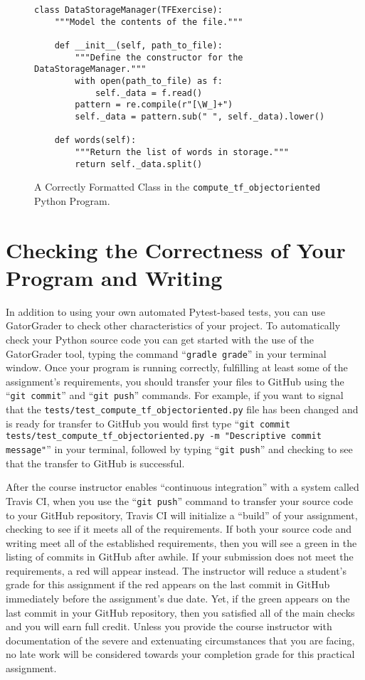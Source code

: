 \documentclass[11pt]{article}
\newcommand{\testprogramsource}{\lstinline{tests/test_compute_tf_objectoriented.py}}
\newcommand{\gatorgraderstart}{\command{gradle grade}}
\newcommand{\gitcommit}{\command{git commit}}
\newcommand{\gitpush}{\command{git push}}
\newcommand{\gitcommittestprogram}{\command{git commit tests/test_compute_tf_objectoriented.py -m "Descriptive commit message"}}
\newcommand{\command}[1]{``\lstinline{#1}''}
\newcommand{\step}[1]{``{#1}''}
\newcommand{\checkmark}{\ding{51}}
\newcommand{\naughtmark}{\ding{55}}
\begin{document}
\begin{figure}[t]
%
\begin{verbatim}
class DataStorageManager(TFExercise):
    """Model the contents of the file."""

    def __init__(self, path_to_file):
        """Define the constructor for the DataStorageManager."""
        with open(path_to_file) as f:
            self._data = f.read()
        pattern = re.compile(r"[\W_]+")
        self._data = pattern.sub(" ", self._data).lower()

    def words(self):
        """Return the list of words in storage."""
        return self._data.split()
\end{verbatim}
%
\vspace*{-.15in}
%
\caption{A Correctly Formatted Class in the {\tt compute\_tf\_objectoriented} Python Program.}\label{fig:data}
%
\vspace*{-.1in}
%
\end{figure}

\section*{Checking the Correctness of Your Program and Writing}

In addition to using your own automated Pytest-based tests, you can use
GatorGrader to check other characteristics of your project. To automatically
check your Python source code you can get started with the use of the
GatorGrader tool, typing the command \gatorgraderstart{} in your terminal
window.
%
Once your program is running correctly, fulfilling at least some of the
assignment's requirements, you should transfer your files to GitHub using the
\gitcommit{} and \gitpush{} commands. For example, if you want to signal that
the \testprogramsource{} file has been changed and is ready for transfer to
GitHub you would first type \gitcommittestprogram{} in your terminal, followed
by typing \gitpush{} and checking to see that the transfer to GitHub is
successful.

After the course instructor enables \step{continuous integration} with a system
called Travis CI, when you use the \gitpush{} command to transfer your source
code to your GitHub repository, Travis CI will initialize a \step{build} of your
assignment, checking to see if it meets all of the requirements. If both your
source code and writing meet all of the established requirements, then you will
see a green \checkmark{} in the listing of commits in GitHub after awhile. If
your submission does not meet the requirements, a red \naughtmark{} will appear
instead. The instructor will reduce a student's grade for this assignment if the
red \naughtmark{} appears on the last commit in GitHub immediately before the
assignment's due date. Yet, if the green \checkmark{} appears on the last commit
in your GitHub repository, then you satisfied all of the main checks and you
will earn full credit. Unless you provide the course instructor with
documentation of the severe and extenuating circumstances that you are facing,
no late work will be considered towards your completion grade for this practical
assignment.
\end{document}
